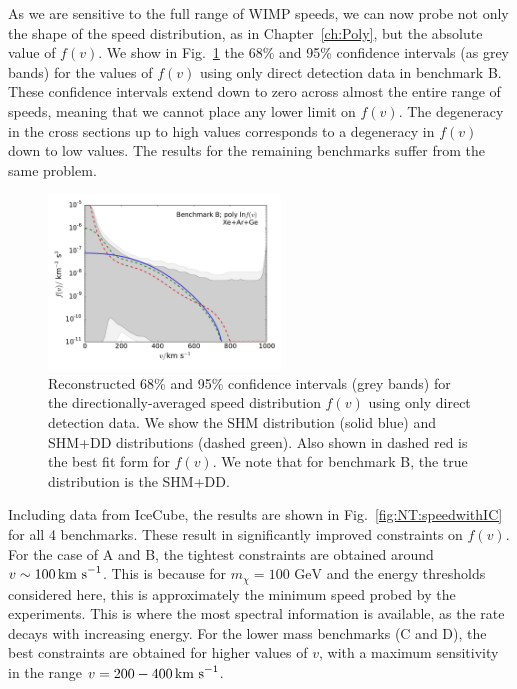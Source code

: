 As we are sensitive to the full range of WIMP speeds, we can now probe not only the shape of the speed distribution, as in Chapter~\ref{ch:Poly}, but the absolute value of $f(v)$. We show in Fig.~\ref{fig:NT:speedwithoutIC} the 68\% and 95\% confidence intervals (as grey bands) for the values of $f(v)$ using only direct detection data in benchmark B. These confidence intervals extend down to zero across almost the entire range of speeds, meaning that we cannot place any lower limit on $f(v)$. The degeneracy in the cross sections up to high values corresponds to a degeneracy in $f(v)$ down to low values. The results for the remaining benchmarks suffer from the same problem.

\begin{figure}[!ht]
  \centering
  \includegraphics[trim=0.5cm 0.5cm 0.5cm 0.5cm, clip,width=0.55\textwidth]{NT/BenchmarkB_poly_noIC-speed.pdf}
\caption{Reconstructed 68\% and 95\% confidence intervals (grey bands) for the directionally-averaged speed distribution $f(v)$ using only direct detection data. We show the SHM distribution (solid blue) and SHM+DD distributions (dashed green). Also shown in dashed red is the best fit form for $f(v)$. We note that for benchmark B, the true distribution is the SHM+DD.}
\label{fig:NT:speedwithoutIC}
\end{figure}

Including data from IceCube, the results are shown in Fig.~\ref{fig:NT:speedwithIC} for all 4 benchmarks. These result in significantly improved constraints on $f(v)$. For the case of A and B, the tightest constraints are obtained around $v \sim 100 \,\textrm{km s}^{-1}$. This is because for $m_\chi = 100 \textrm{ GeV}$ and the energy thresholds considered here, this is approximately the minimum speed probed by the experiments. This is where the most spectral information is available, as the rate decays with increasing energy. For the lower mass benchmarks (C and D), the best constraints are obtained for higher values of $v$, with a maximum sensitivity in the range $v=200-400 \,\textrm{km s}^{-1}$.


